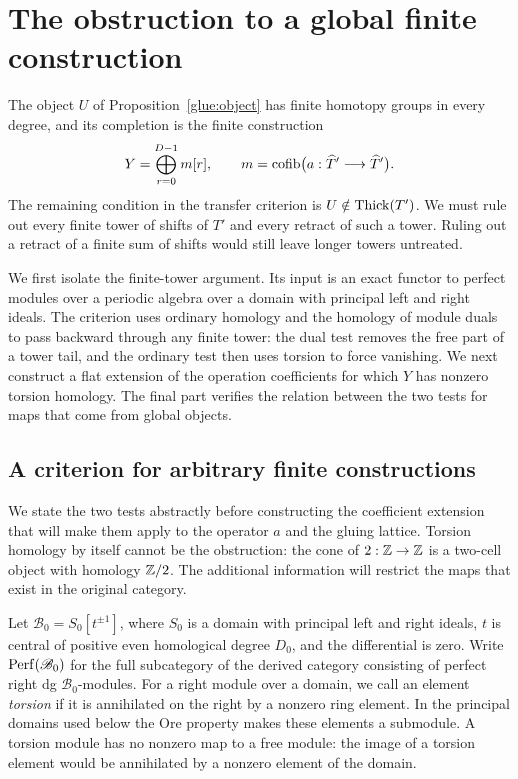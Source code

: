 \section{The obstruction to a global finite construction}
\label{obs:section}

The object $U$ of Proposition~\ref{glue:object} has finite homotopy
groups in every degree, and its completion is the finite construction
\[
 Y=\bigoplus_{r=0}^{D-1}m[r],\qquad
 m=\operatorname{cofib}\bigl(a:\widehat T'\longrightarrow\widehat T'\bigr).
\]
The remaining condition in the transfer criterion is
$U\notin\operatorname{Thick}(T')$.  We must rule out every finite tower of shifts
of $T'$ and every retract of such a tower.  Ruling out a retract
of a finite sum of shifts would still leave longer towers untreated.

We first isolate the finite-tower argument.  Its input is an exact
functor to perfect modules over a periodic algebra over a domain
with principal left and right ideals.  The criterion uses ordinary
homology and the homology of module duals
to pass backward through any finite tower: the dual test removes
the free part of a tower tail, and the ordinary test then uses
torsion to force vanishing.  We next construct a flat extension of
the operation coefficients for which $Y$ has nonzero torsion
homology.  The final part verifies the relation between the two
tests for maps that come from global objects.

\subsection{A criterion for arbitrary finite constructions}

We state the two tests abstractly before constructing the
coefficient extension that will make them apply to the operator
$a$ and the gluing lattice.  Torsion homology by itself
cannot be the obstruction: the cone of $2:\mathbb Z\to\mathbb Z$ is a two-cell
object with homology $\mathbb Z/2$.  The additional information will
restrict the maps that exist in the original category.

Let $\mathscr B_0=S_0[t^{\pm1}]$, where $S_0$ is a domain with principal
left and right ideals, $t$ is central of positive even homological
degree $D_0$, and the differential is zero.  Write $\operatorname{Perf}(\mathscr B_0)$
for the full subcategory of the derived category consisting of
perfect right dg $\mathscr B_0$-modules.
For a right module over a domain, we call an element \emph{torsion}
if it is annihilated on the right by a nonzero ring element.  In the
principal domains used below the Ore property makes these elements
a submodule.  A torsion module has no nonzero map to a free module:
the image of a torsion element would be annihilated by a nonzero
element of the domain.

